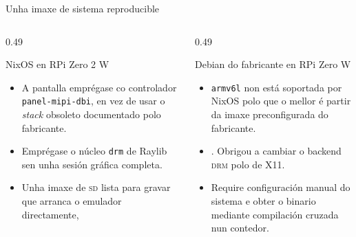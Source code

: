 \begin{frame}{Unha imaxe de sistema reproducible}
  \footnotesize
  \begin{columns}[t]
    \begin{column}{0.49\textwidth}
      \begin{block}{NixOS en RPi Zero 2 W}
        \begin{itemize}
          \item A pantalla emprégase co controlador \texttt{panel-mipi-dbi},
          en vez de usar o \textit{stack} obsoleto documentado polo fabricante.

          \item Emprégase o núcleo \texttt{drm} de Raylib sen unha sesión gráfica completa. 

          \item Unha imaxe de \textsc{sd} lista para gravar que arranca o emulador directamente,

        \end{itemize}
      \end{block}
    \end{column}
    \begin{column}{0.49\textwidth}
      \begin{block}{Debian do fabricante en RPi Zero W}
        \begin{itemize}
          \item \texttt{armv6l} non está soportada por NixOS polo que o mellor é partir da imaxe preconfigurada do fabricante.

          \item {}. Obrigou a
          cambiar o backend \textsc{drm} polo de X11.

          \item Require configuración manual do sistema e obter o binario mediante compilación cruzada nun contedor.
        \end{itemize}
      \end{block}
    \end{column}
  \end{columns}
\end{frame}

